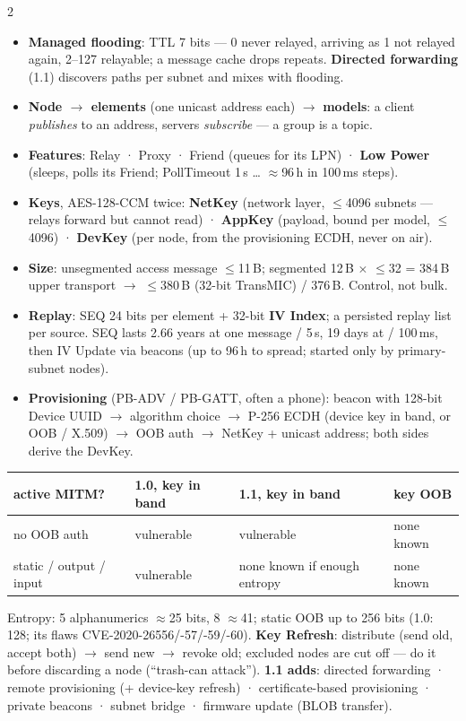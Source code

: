 \documentclass[8pt]{extarticle}
\begin{document}
\begin{multicols}{2}
\begin{itemize}
  \item \textbf{Managed flooding}: TTL 7 bits — 0 never relayed, arriving as 1 not relayed again,
        2–127 relayable; a message cache drops repeats. \textbf{Directed forwarding} (1.1) discovers
        paths per subnet and mixes with flooding.
  \item \textbf{Node $\to$ elements} (one unicast address each) $\to$ \textbf{models}: a client
        \emph{publishes} to an address, servers \emph{subscribe} — a group is a topic.
  \item \textbf{Features}: Relay · Proxy · Friend (queues for its LPN) · \textbf{Low Power} (sleeps,
        polls its Friend; PollTimeout 1\,s … $\approx$96\,h in 100\,ms steps).
  \item \textbf{Keys}, AES-128-CCM twice: \textbf{NetKey} (network layer, $\le$4096 subnets — relays
        forward but cannot read) · \textbf{AppKey} (payload, bound per model, $\le$4096) ·
        \textbf{DevKey} (per node, from the provisioning ECDH, never on air).
  \item \textbf{Size}: unsegmented access message $\le$11\,B; segmented 12\,B $\times$ $\le$32 = 384\,B
        upper transport $\to$ $\le$380\,B (32-bit TransMIC) / 376\,B. Control, not bulk.
  \item \textbf{Replay}: SEQ 24 bits per element + 32-bit \textbf{IV Index}; a persisted replay list per
        source. SEQ lasts 2.66 years at one message / 5\,s, 19 days at / 100\,ms, then IV Update via
        beacons (up to 96\,h to spread; started only by primary-subnet nodes).
  \item \textbf{Provisioning} (PB-ADV / PB-GATT, often a phone): beacon with 128-bit Device UUID $\to$
        algorithm choice $\to$ P-256 ECDH (device key in band, or OOB / X.509) $\to$ OOB auth $\to$
        NetKey + unicast address; both sides derive the DevKey.
\end{itemize}
{\scriptsize\setlength{\tabcolsep}{2pt}
\begin{tabular}{@{}>{\raggedright\arraybackslash}p{19mm}>{\raggedright\arraybackslash}p{16mm}>{\raggedright\arraybackslash}p{24mm}>{\raggedright\arraybackslash}p{14mm}@{}}
\toprule
\textbf{active MITM?} & \textbf{1.0, key in band} & \textbf{1.1, key in band} & \textbf{key OOB}\\
\midrule
no OOB auth & vulnerable & vulnerable & none known\\
static / output / input & vulnerable & none known if enough entropy & none known\\
\bottomrule
\end{tabular}}\par
Entropy: 5 alphanumerics $\approx$25 bits, 8 $\approx$41; static OOB up to 256 bits (1.0: 128; its
flaws CVE-2020-26556/-57/-59/-60). \textbf{Key Refresh}: distribute (send old, accept both) $\to$ send
new $\to$ revoke old; excluded nodes are cut off — do it before discarding a node (``trash-can
attack''). \textbf{1.1 adds}: directed forwarding · remote provisioning (+ device-key refresh) ·
certificate-based provisioning · private beacons · subnet bridge · firmware update (BLOB transfer).


\end{multicols}
\end{document}
